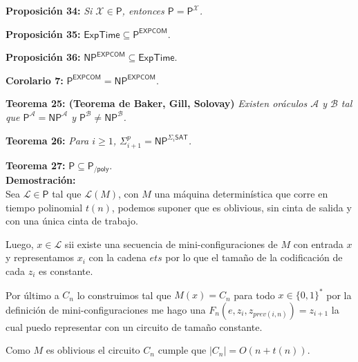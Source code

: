 \documentclass{article}
\begin{document}
\begin{flushleft}
  \textbf{Proposición 34:}
  \textit{Si $\mathcal{X} \in \mathsf{P}$, entonces $\mathsf{P} = \mathsf{P}^\mathcal{X}$.}
\end{flushleft}

\begin{flushleft}
  \textbf{Proposición 35:}
  $\mathsf{ExpTime \subseteq P^{EXPCOM}}$.
\end{flushleft}

\begin{flushleft}
  \textbf{Proposición 36:}
  $\mathsf{NP^{EXPCOM} \subseteq ExpTime}$.
\end{flushleft}

\begin{flushleft}
  \textbf{Corolario 7:}
  $\mathsf{P^{EXPCOM} = NP^{EXPCOM}}$.
\end{flushleft}

\begin{flushleft}
  \textbf{Teorema 25: \hypertarget{baker}{\textcolor{Bittersweet}{(Teorema de Baker, Gill, Solovay)}}}
  \textit{Existen oráculos $\mathcal{A}$ y $\mathcal{B}$ tal que $\mathsf{P}^\mathcal{A} = \mathsf{NP}^
  \mathcal{A}$ y $\mathsf{P}^\mathcal{B} \neq \mathsf{NP}^\mathcal{B}$.}
\end{flushleft}

\begin{flushleft}
  \textbf{Teorema 26:}
  \textit{Para $i \geq 1$, $\Sigma^p_{i+1} = \mathsf{NP}^{\Sigma_i \mathsf{SAT}}$.}
\end{flushleft}

\begin{flushleft}
  \textbf{\hypertarget{teo27}{Teorema 27:}}
  $\mathsf{P \subseteq P_{/poly}}$. \\[0.5em]

  \textbf{\textcolor{Mulberry}{Demostración:}} \\[0.5em]

  Sea $\mathcal{L} \in \mathsf{P}$ tal que $\mathcal{L}(M)$, con $M$ una máquina determinística que corre en 
  tiempo polinomial $t(n)$, podemos suponer que es oblivious, sin cinta de salida y con una única cinta de trabajo.

  Luego, $x \in \mathcal{L}$ sii existe una secuencia de mini-configuraciones de $M$ con entrada $x$ y representamos $x_i$
  con la cadena $ets$ por lo que el tamaño de la codificación de cada $z_i$ es constante.

  Por último a $C_n$ lo construimos tal que $M(x) = C_n$ para todo $x \in \{0,1\}^*$ por la definición de 
  mini-configuraciones me hago una $F_n(e, z_i, z_{prev(i,n)}) = z_{i+1}$ la cual puedo representar con un circuito 
  de tamaño constante.

  Como $M$ es oblivious el circuito $C_n$ cumple que $|C_n| = O(n + t(n))$.

\end{flushleft}
\end{document}
